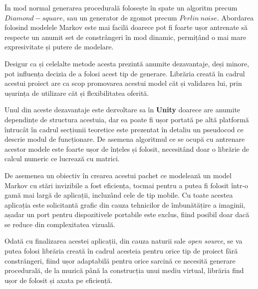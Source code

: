 În mod normal generarea procedurală folosește în spate un algoritm precum $Diamond-square$, sau un generator de zgomot precum $Perlin \ noise$. Abordarea folosind modelele Markov este mai facilă doarece pot fi foarte ușor antrenate să respecte un anumit set de constrângeri în mod dinamic, permițând o mai mare expresivitate și putere de modelare. \par

Desigur ca și celelalte metode acesta prezintă anumite dezavantaje, deși minore, pot influența decizia de a folosi acest tip de generare. Librăria creată în cadrul acestui proiect are ca scop promovarea acestui model căt și validarea lui, prin ușurința de utilizare căt și flexibilitatea oferită.\par

Unul din aceste dezavantaje este dezvoltare sa în \textbf{Unity} doarece are anumite dependințe de structura acestuia, dar ea poate fi ușor portată pe altă platformă întrucât în cadrul secțiunii teoretice este prezentat în detaliu un pseudocod ce descrie modul de funcționare. De asemena algoritmul ce se ocupă cu antrenare acestor modele este foarte ușor de înțeles și folosit, necesitând doar o librărie de calcul numeric ce lucrează cu matrici.\par  

De asemenea un obiectiv în crearea acestui pachet ce modelează un model Markov cu stări invizibile a fost eficiența, tocmai pentru a putea fi folosit într-o gamă mai largă de aplicații, incluzând cele de tip mobile. Cu toate acestea aplicația este solicitantă grafic din cauza tehnicilor de îmbunătățire a imaginii, așadar un port pentru dispozitivele portabile este exclus, fiind posibil doar dacă se reduce din complexitatea vizuală.\par

Odată cu finalizarea acestei aplicații, din cauza naturii sale \textit{open source}, se va putea folosi librăria creată în cadrul acesteia pentru orice tip de proiect fără constrăngeri, fiind ușor adaptabilă pentru orice sarcină ce necesită generare procedurală, de la muzică până la construcția unui mediu virtual, librăria find ușor de folosit și axata pe eficiență.\par
